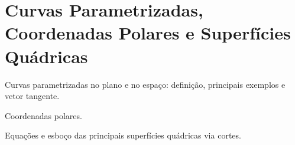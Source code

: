 \chapter{Curvas Parametrizadas, Coordenadas Polares e Superfícies Quádricas}

Curvas parametrizadas no plano e no espaço: definição, principais exemplos e vetor tangente.

Coordenadas polares.

Equações e esboço das principais superfícies quádricas via cortes.

